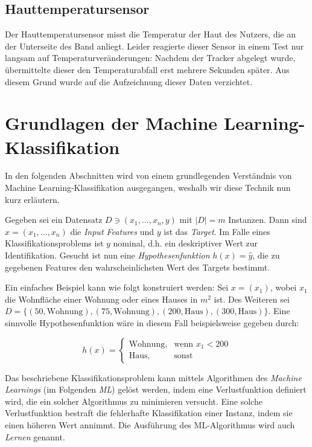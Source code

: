 \subsection{Hauttemperatursensor}
Der Hauttemperatursensor misst die Temperatur der Haut des Nutzers, die an der Unterseite des Band anliegt. Leider reagierte dieser Sensor in einem Test nur langsam auf Temperaturveränderungen: Nachdem der Tracker abgelegt wurde, übermittelte dieser den Temperaturabfall erst mehrere Sekunden später. Aus diesem Grund wurde auf die Aufzeichnung dieser Daten verzichtet.


\section{Grundlagen der Machine Learning-Klassifikation}
In den folgenden Abschnitten wird von einem grundlegenden Verständnis von Machine Learning-Klassifikation ausgegangen, weshalb wir diese Technik nun kurz erläutern. \\
\begin{definition}[ML-Klassifikation]
Gegeben sei ein Datensatz $D \ni (x_1, ..., x_n, y)$ mit $|D| = m$ Instanzen. Dann sind $x = (x_1, ..., x_n)$ die \textit{Input Features} und $y$ ist das \textit{Target}. Im Falle eines Klassifikationsproblems ist $y$ nominal, d.h. ein deskriptiver Wert zur Identifikation. Gesucht ist nun eine \textit{Hypothesenfunktion} $h(x) = \hat{y}$, die zu gegebenen Features den wahrscheinlichsten Wert des Targets bestimmt\cite{Ng2011a}.
\end{definition}\label{def:ml-classification}

Ein einfaches Beispiel kann wie folgt konstruiert werden: Sei $x = (x_1)$, wobei $x_1$ die Wohnfläche einer Wohnung oder eines Hauses in $m^2$ ist. Des Weiteren sei $D = \{(50, \text{Wohnung}), (75, \text{Wohnung}), (200, \text{Haus}), (300, \text{Haus})\}$. Eine sinnvolle Hypothesenfunktion wäre in diesem Fall beispielsweise gegeben durch:

\[
h(x) = 
\begin{cases}
\text{Wohnung}, & \text{wenn } x_1 < 200 \\
\text{Haus}, & \text{sonst}
\end{cases}
\]

Das beschriebene Klassifikationsproblem kann mittels Algorithmen des \textit{Machine Learnings} (im Folgenden \textit{ML}) gelöst werden, indem eine Verlustfunktion definiert wird, die ein solcher Algorithmus zu minimieren versucht. Eine solche Verlustfunktion bestraft die fehlerhafte Klassifikation einer Instanz, indem sie einen höheren Wert annimmt. Die Ausführung des ML-Algorithmus wird auch \textit{Lernen} genannt.

